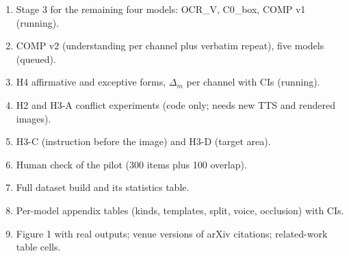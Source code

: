\begin{enumerate}[leftmargin=*,itemsep=0pt]
  \item Stage 3 for the remaining four models: OCR\_V, C0\_box, COMP v1 (running).
  \item COMP v2 (understanding per channel plus verbatim repeat), five models (queued).
  \item H4 affirmative and exceptive forms, $\Delta_m$ per channel with CIs (running).
  \item H2 and H3-A conflict experiments (code only; needs new TTS and rendered images).
  \item H3-C (instruction before the image) and H3-D (target area).
  \item Human check of the pilot (300 items plus 100 overlap).
  \item Full dataset build and its statistics table.
  \item Per-model appendix tables (kinds, templates, split, voice, occlusion) with CIs.
  \item Figure 1 with real outputs; venue versions of arXiv citations; related-work table cells.
\end{enumerate}
